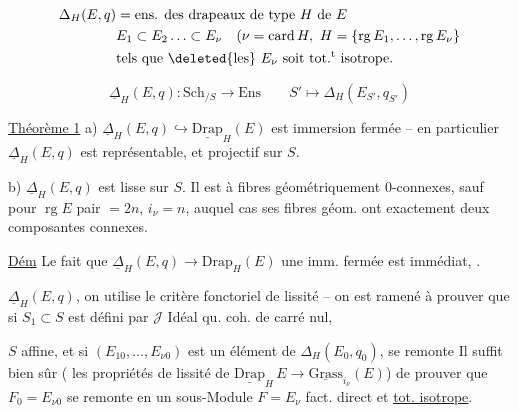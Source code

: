 \[
 \begin{aligned}
 \Delta_H(E,q)&=\text{ens. des drapeaux de type }H\text{ de }E\\
 &E_1\subset E_2\ldots\subset E_\nu\quad(\nu=\operatorname{card} H,\ H=\{\operatorname{rg} E_1,\ldots,\operatorname{rg} E_\nu\}\\
 &\text{tels que }\deleted{\text{les}}\ E_\nu\text{ soit tot.}^{\mathrm t}\text{ isotrope.}
 \end{aligned}
\]

\[
 \underline\Delta_H(E,q):\mathrm{Sch}_{/S}\longrightarrow\mathrm{Ens}\qquad S'\longmapsto\Delta_H(E_{S'},q_{S'})
\]

\uline{Théorème 1} a) $\underline\Delta_H(E,q)\hookrightarrow\underline{\mathrm{Drap}}_H(E)$ est   immersion fermée -- en particulier $\underline\Delta_H(E,q)$ est représentable, et projectif sur $S$.

b) $\underline\Delta_H(E,q)$ est lisse sur $S$. Il est à fibres géométriquement $0$-connexes, sauf pour  $\operatorname{rg}E$ pair $=2n$, $i_\nu=n$, auquel cas  ses fibres géom. ont exactement deux composantes connexes.


\uline{Dém} Le fait que $\underline\Delta_H(E,q)\to\mathrm{Drap}_H(E)$ une imm. fermée est immédiat,  .

 $\underline\Delta_H(E,q)$, on utilise le critère fonctoriel de lissité -- on est ramené à prouver que si $S_1\subset S$ est défini par $\mathcal J$ Idéal qu. coh. de carré nul,


$S$ affine, et si $(E_{10},\ldots,E_{\nu0})$ est un élément de $\Delta_H(E_0,q_0)$,  se remonte  Il suffit bien sûr ( les propriétés de lissité de $\underline{\mathrm{Drap}}_H\,E\longrightarrow\underline{\mathrm{Grass}}_{i_\nu}(E)$) de prouver que $F_0=E_{\nu0}$ se remonte en un sous-Module $F=E_\nu$  fact. direct et \uline{tot. isotrope}.

